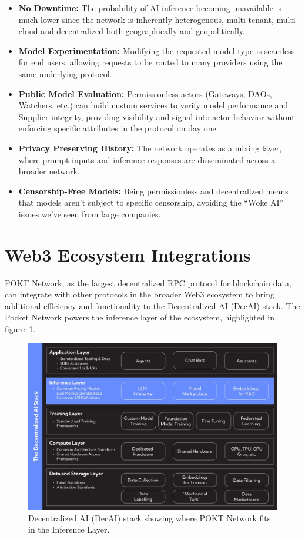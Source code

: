 \documentclass[conference,compsoc]{IEEEtran}
\begin{document}
\begin{itemize}
    \item \textbf{No Downtime:} The probability of AI inference becoming unavailable is much lower since the network is inherently heterogenous, multi-tenant, multi-cloud and decentralized both geographically and geopolitically.

    \item \textbf{Model Experimentation: } Modifying the requested model type is seamless for end users, allowing requests to be routed to many providers using the same underlying protocol.

    \item \textbf{Public Model Evaluation:} Permissionless actors (Gateways, DAOs, Watchers, etc.) can build custom services to verify model performance and Supplier integrity, providing visibility and signal into actor behavior without enforcing specific attributes in the protocol on day one.

    \item \textbf{Privacy Preserving History:} The network operates as a mixing layer, where prompt inputs and inference responses are disseminated across a broader network.
    
    \item \textbf{Censorship-Free Models:}  Being permissionless and decentralized means that models aren’t subject to specific censorship, avoiding the “Woke AI”~\cite{thefpGooglesWoke} issues we’ve seen from large companies.
\end{itemize}

\section{Web3 Ecosystem Integrations}

POKT Network, as the largest decentralized RPC protocol for blockchain data, can integrate with other protocols in the broader Web3 ecosystem to bring additional efficiency and functionality to the Decentralized AI (DecAI) stack. The Pocket Network powers the inference layer of the ecosystem, highlighted in figure~\ref{fig_stack}.


\begin{figure}[!h]
\centering
\includegraphics[width=0.9\linewidth]{stack.jpeg}
\caption{Decentralized AI (DecAI) stack showing where POKT Network fits in the Inference Layer.}
\label{fig_stack}
\end{figure}
\end{document}
